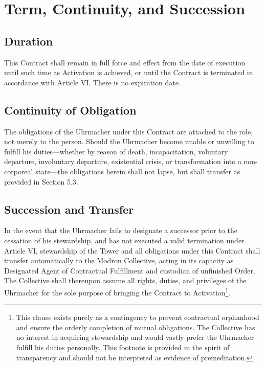 \documentclass[12pt]{article}
\begin{document}

\section{Term, Continuity, and Succession}

\subsection{Duration}
This Contract shall remain in full force and effect from the date of
execution until such time as Activation is achieved, or until the
Contract is terminated in accordance with Article VI. There is no expiration date.

\subsection{Continuity of Obligation}
The obligations of the Uhrmacher under this Contract are attached to
the role, not merely to the person. Should the Uhrmacher become
unable or unwilling to fulfill his duties---whether by reason of
death, incapacitation, voluntary departure, involuntary departure,
existential crisis, or transformation into a non-corporeal
state---the obligations herein shall not lapse, but shall transfer
as provided in Section 5.3.

\subsection{Succession and Transfer}
In the event that the Uhrmacher fails to designate a successor prior
to the cessation of his stewardship, and has not executed a valid
termination under Article VI, stewardship of the Tower and all
obligations under this Contract shall transfer automatically to the
Modron Collective, acting in its capacity as Designated Agent of
Contractual Fulfillment and custodian of unfinished Order. The
Collective shall thereupon assume all rights, duties, and privileges
of the Uhrmacher for the sole purpose of bringing the Contract to
Activation\footnote{This clause exists purely as a contingency to
prevent contractual orphanhood and ensure the orderly completion of
mutual obligations. The Collective has no interest in acquiring
stewardship and would vastly prefer the Uhrmacher fulfill his duties
personally. This footnote is provided in the spirit of transparency
and should not be interpreted as evidence of premeditation.}.
\end{document}

